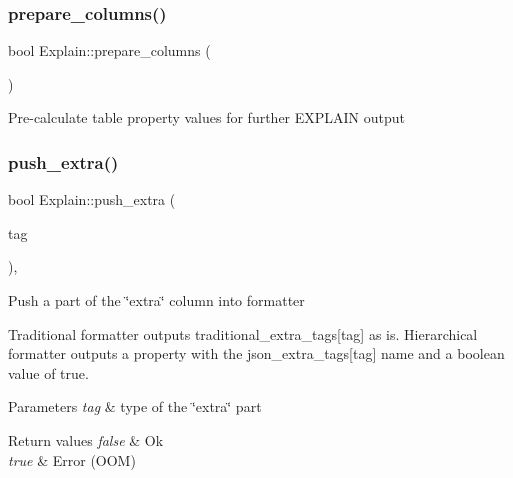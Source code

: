 \subsubsection{\texorpdfstring{prepare\+\_\+columns()}{prepare\_columns()}}
{\footnotesize\ttfamily bool Explain\+::prepare\+\_\+columns (\begin{DoxyParamCaption}{ }\end{DoxyParamCaption})\hspace{0.3cm}{\ttfamily [protected]}}

Pre-\/calculate table property values for further E\+X\+P\+L\+A\+IN output \mbox{\label{classExplain_a52e25da1e96991443d9fda548293bebf}} 
\subsubsection{\texorpdfstring{push\+\_\+extra()}{push\_extra()}\hspace{0.1cm}{\footnotesize\ttfamily [1/3]}}
{\footnotesize\ttfamily bool Explain\+::push\+\_\+extra (\begin{DoxyParamCaption}\item[{Extra\+\_\+tag}]{tag }\end{DoxyParamCaption})\hspace{0.3cm}{\ttfamily [inline]}, {\ttfamily [protected]}}

Push a part of the \char`\"{}extra\char`\"{} column into formatter

Traditional formatter outputs traditional\+\_\+extra\+\_\+tags\mbox{[}tag\mbox{]} as is. Hierarchical formatter outputs a property with the json\+\_\+extra\+\_\+tags\mbox{[}tag\mbox{]} name and a boolean value of true.


\begin{DoxyParams}{Parameters}
{\em tag} & type of the \char`\"{}extra\char`\"{} part\\
\hline
\end{DoxyParams}

\begin{DoxyRetVals}{Return values}
{\em false} & Ok \\
\hline
{\em true} & Error (O\+OM) \\
\hline
\end{DoxyRetVals}
\mbox{\label{classExplain_a08fe671cc2e7de54a18a3aa886af2ac6}} 
